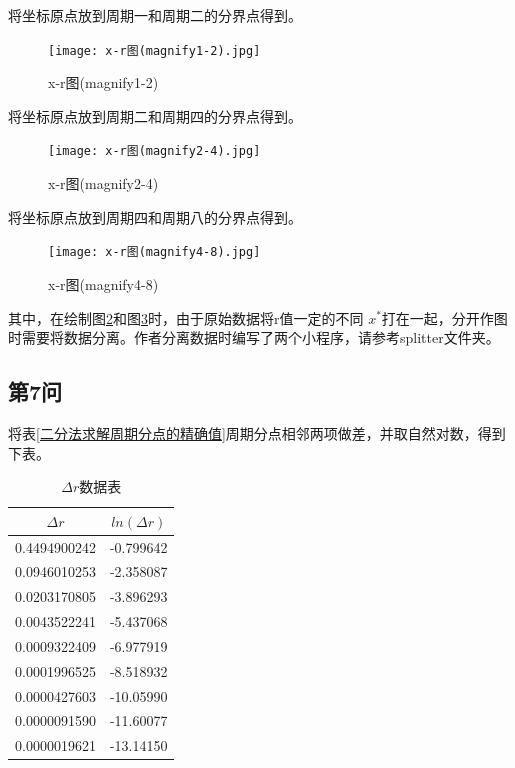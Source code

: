 \documentclass[10pt, a4paper]{article}
\begin{document}
    将坐标原点放到周期一和周期二的分界点得到。

    \begin{figure}[H]
        \centering
        \texttt{[image: x-r图(magnify1-2).jpg]}
        \caption{x-r图(magnify1-2)}\label{x-r图(magnify1-2)}
    \end{figure}

    将坐标原点放到周期二和周期四的分界点得到。

    \begin{figure}[H]
        \centering
        \texttt{[image: x-r图(magnify2-4).jpg]}
        \caption{x-r图(magnify2-4)}
        \label{fig:x-r-magnify2-4}
    \end{figure}

    将坐标原点放到周期四和周期八的分界点得到。

    \begin{figure}[H]
        \centering
        \texttt{[image: x-r图(magnify4-8).jpg]}
        \caption{x-r图(magnify4-8)}
        \label{fig:x-r-magnify4-8}
    \end{figure}

    其中，在绘制图\ref{fig:x-r-magnify2-4}和图\ref{fig:x-r-magnify4-8}时，由于原始数据将r值一定的不同
    $x^*$打在一起，分开作图时需要将数据分离。作者分离数据时编写了两个小程序，请参考splitter文件夹。

    \subsection{第7问}

    将表\ref{二分法求解周期分点的精确值}周期分点相邻两项做差，并取自然对数，得到下表。

    \begin{table}[H]
        \centering
        \caption{$\Delta r$数据表}
        \begin{tabular}{|c|c|}\hline
            $\Delta r$&$ln(\Delta r)$ \\\hline
        0.4494900242  & -0.799642 \\\hline
        0.0946010253  & -2.358087 \\\hline
        0.0203170805  & -3.896293 \\\hline
        0.0043522241  & -5.437068 \\\hline
        0.0009322409  & -6.977919 \\\hline
        0.0001996525  & -8.518932 \\\hline
        0.0000427603  & -10.05990 \\\hline
        0.0000091590  & -11.60077 \\\hline
        0.0000019621  & -13.14150 \\\hline
        \end{tabular}%
        \label{tab:Delta-r数据表}%
    \end{table}%
    
\end{document}
